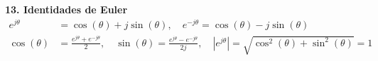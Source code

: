 \documentclass[10pt, a4paper, twocolumn]{article}
\begin{document}
\vspace{2pt}
\textbf{13. Identidades de Euler}
\begin{align*}
    e^{j\theta} &= \cos(\theta) + j\sin(\theta), \quad e^{-j\theta} = \cos(\theta) - j\sin(\theta) \\
    \cos(\theta) &= \frac{e^{j\theta} + e^{-j\theta}}{2}, \quad \sin(\theta) = \frac{e^{j\theta} - e^{-j\theta}}{2j}, \quad \left|e^{j\theta}\right| = \sqrt{\cos^2(\theta) + \sin^2(\theta)} = 1
\end{align*}
\end{document}
